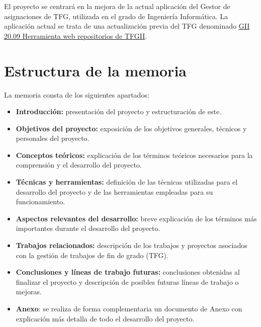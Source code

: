 
El proyecto se centrará en la mejora de la actual aplicación del Gestor de asignaciones de TFG, utilizada en el grado de Ingeniería Informática. La aplicación actual se trata de una actualización previa del TFG denominado \href{https://github.com/dbo1001/Gestor-TFG-2021}{GII 20.09 Herramienta web
repositorios de TFGII}. 



\section{Estructura de la memoria}
La memoria consta de los siguientes apartados:

\begin{itemize}
	\item \textbf{Introducción:} presentación del proyecto y estructuración de este.
	\item \textbf{Objetivos del proyecto:}  exposición de los  objetivos generales, técnicos y personales del proyecto.
	\item \textbf{Conceptos teóricos:} explicación de los términos teóricos necesarios para la comprensión y el desarrollo del proyecto.
	\item \textbf{Técnicas y herramientas:} definición de las técnicas utilizadas para el desarrollo del proyecto y de las herramientas empleadas para su funcionamiento.
	\item \textbf{Aspectos relevantes del desarrollo:} breve explicación de los términos más importantes durante el desarrollo del proyecto.
	\item \textbf{Trabajos relacionados:} descripción de los trabajos y proyectos asociados con la gestión de trabajos de fin de grado (TFG).
	\item \textbf{Conclusiones y líneas de trabajo futuras:} conclusiones obtenidas al finalizar el proyecto y descripción de posibles futuras líneas de trabajo o mejoras.
	\item \textbf{Anexo}: se realiza de forma complementaria un documento de Anexo con explicación más detalla de todo el desarrollo del proyecto.
\end{itemize}